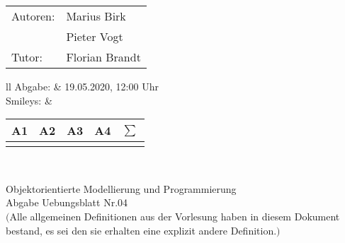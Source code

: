 \documentclass[12pt,a4paper,oneside,ngerman]{article}
\newcommand{\fach}{Objektorientierte Modellierung und Programmierung}
\newcommand{\dokumentenTitel}{Abgabe Uebungsblatt Nr.04}
\newcommand{\Abgabe}{19.05.2020, 12:00 Uhr}
\newcommand{\memberOne}{Marius Birk}
\newcommand{\memberTwo}{Pieter Vogt}
\newcommand{\tutor}{ Florian Brandt }
\begin{document}
	\thispagestyle{plain} %
	
	\begin{multicols}{2} %
		\hspace{-1cm} %
		\begin{tabular}{ll} %
			Autoren: & \memberOne \\ %
			& \memberTwo \\
			Tutor: & \tutor \\  
		\end{tabular}
		
		\columnbreak %
		\hspace{-1cm} %
		\begin{tabular}{ll} %
			Abgabe: & \Abgabe \\ %
			Smileys: &  
			\renewcommand{\arraystretch}{1.2} 
			\begin{tabular}{|p{0.8cm}|p{0.8cm}|p{0.8cm}|p{0.8cm}|p{0.8cm}|}
				\hline A1 & A2 & A3 & A4 &$\sum\limits^{ }$ \\ \hline
				& & & & \\ \hline    
			\end{tabular} \\
		\end{tabular}
		
	\end{multicols} %
	
	\begin{center}
		\Large{\fach} \\
		\LARGE{\dokumentenTitel} \\
		\small
		$($Alle allgemeinen Definitionen aus der Vorlesung haben in diesem Dokument bestand, es sei den sie erhalten eine explizit andere Definition.$)$
	\end{center}
\end{document}
